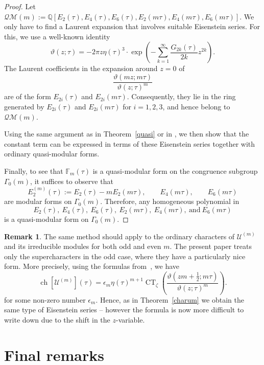 \documentclass[pdftex]{sigma}
\numberwithin{equation}{section}
\theoremstyle{definition}
\newtheorem{Remark}[Theorem]{Remark}
\begin{document}
\begin{proof} Let ${\mathcal{QM}}(m):=\mathbb{Q}[E_2(\tau),E_4(\tau),E_6(\tau),E_2(m \tau),E_4(m \tau),E_6(m \tau)]$.
We only have to find a Laurent expansion that involves suitable Eisenstein series.
For this, we use a well-known identity \cite{Lang}
\[
\vartheta(z;\tau)=-2 \pi z \eta(\tau)^3 \cdot \exp \left(-\sum_{k=1}^\infty \frac{G_{2k}(\tau)}{2k} z^{2k} \right).
\]
The Laurent coefficients in the expansion around $z=0$ of
\[
\frac{\vartheta(mz; m\tau)}{\vartheta(z; \tau)^m}
\]
are of the form $E_{2i}(\tau)$ and $E_{2i}(m\tau)$. Consequently, they lie in the ring generated by $E_{2i}(\tau)$ and $E_{2i}(m\tau)$ for $i=1,2,3$, and hence belong to $\mathcal{QM}(m)$.

Using the same argument as in Theorem~\ref{quasi} or in \cite{AM}, we then show that the constant term can be expressed in terms of these Eisenstein series together with ordinary quasi-modular forms.

Finally, to see that $\mathbb{F}_m(\tau)$ is a quasi-modular form on the congruence subgroup $\Gamma_0(m)$, it suffices to observe that
\[
E^{(m)}_2(\tau) := E_2(\tau) - m E_2(m\tau), \qquad
E_4(m\tau), \qquad
E_6(m\tau)
\]
are modular forms on $\Gamma_0(m)$.
Therefore, any homogeneous polynomial in
\[
E_2(\tau),\ E_4(\tau),\ E_6(\tau),\ E_2(m\tau),\ E_4(m\tau),\ \text{and} \ E_6(m\tau)
\]
is a quasi-modular form on $\Gamma_0(m)$.
\end{proof}

\begin{Remark} \label{char-ord} The same method should apply to the ordinary characters of
$\mathcal{U}^{(m)}$ and its irreducible modules for both odd and even $m$.
The present paper treats only the supercharacters in the odd case, where they
have a particularly nice form. More precisely, using the formulas from~\cite{AM}, we have
\[
\operatorname{ch}[\mathcal{U}^{(m)}](\tau) = \epsilon_m \eta(\tau)^{m+1} \operatorname{CT}_\zeta \left( \frac{\vartheta\left(zm + \frac{1}{2}; m\tau\right)}{\vartheta(z; \tau)^m} \right).
\]
for some non-zero number $\epsilon_m$. Hence, as in Theorem~\ref{charum} we obtain the same type of Eisenstein series -- however the formula is now more difficult to write down due to the shift in the $z$-variable.
\end{Remark}

\section{Final remarks}\label{section5}
\end{document}
